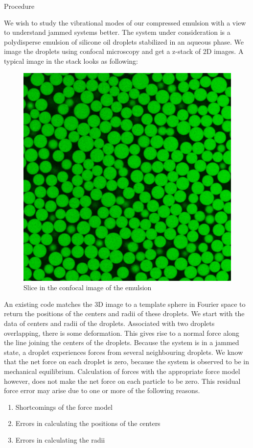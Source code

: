 \documentclass[12pt]{article}
\begin{document}
\begin{section}{Procedure}

We wish to study the vibrational modes of our compressed emulsion with a view to understand jammed systems better. The system under consideration is a polydisperse emulsion of silicone oil droplets stabilized in an aqueous phase. We image the droplets using confocal microscopy and get a z-stack of 2D images. A typical image in the stack looks as following:
\begin{figure}[h!]
    \centering
    \includegraphics[width=0.5\linewidth]{emulsion_one_slice.png}
    \caption{Slice in the confocal image of the emulsion}
    \label{fig:my_label}
\end{figure}
\par \noindent An existing code matches the 3D image to a template sphere in Fourier space to return the positions of the centers and radii of these droplets. We start with the data of centers and radii of the droplets. Associated with two droplets overlapping, there is some deformation. This gives rise to a normal force along the line joining the centers of the droplets. Because the system is in a jammed state, a droplet experiences forces from several neighbouring droplets. We know that the net force on each droplet is zero, because the system is observed to be in mechanical equilibrium. Calculation of forces with the appropriate force model however, does not make the net force on each particle to be zero. This residual force error may arise due to one or more of the following reasons. 
\begin{enumerate}
    \item Shortcomings of the force model
    \item Errors in calculating the positions of the centers
    \item Errors in calculating the radii
\end{enumerate}

\end{section}
\end{document}
